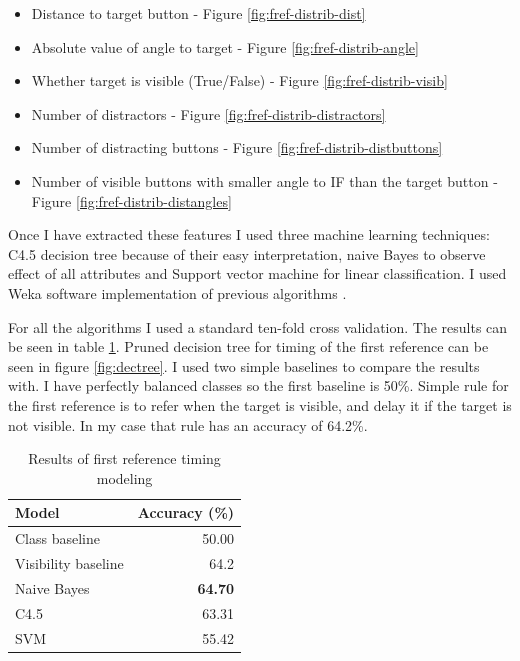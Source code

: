 \begin{itemize}
\item
Distance to target button - Figure \ref{fig:fref-distrib-dist}
\item
Absolute value of angle to target - Figure \ref{fig:fref-distrib-angle}
\item
Whether target is visible (True/False) - Figure \ref{fig:fref-distrib-visib}
\item
Number of distractors - Figure \ref{fig:fref-distrib-distractors}
\item
Number of distracting buttons - Figure \ref{fig:fref-distrib-distbuttons}
\item
Number of visible buttons with smaller angle to IF than the target button - Figure \ref{fig:fref-distrib-distangles}
\end{itemize}

Once I have extracted these features I used three machine learning techniques: C4.5 decision tree because of their easy interpretation, naive Bayes to observe effect of all attributes and Support vector machine for linear classification. I used Weka software implementation of previous algorithms \citep{hall2009weka}.

For all the algorithms I used a standard ten-fold cross validation. The results can be seen in table \ref{tab:firstref}. Pruned decision tree for timing of the first reference can be seen in figure \ref{fig:dectree}. I used two simple baselines to compare the results with. I have perfectly balanced classes so the first baseline is 50\%. Simple rule for the first reference is to refer when the target is visible, and delay it if the target is not visible. In my case that rule has an accuracy of 64.2\%. 

\begin{table}[!htbp]
 \centering
\begin{tabular}{lr}
\toprule
Model    & Accuracy (\%)  \\
\midrule
Class baseline    & 50.00\\
Visibility baseline & 64.2\\
\midrule
Naive Bayes  & \textbf{64.70} \\
C4.5 & 63.31 \\
SVM & 55.42 \\
\bottomrule
\end{tabular}
\caption{Results of first reference timing modeling}
\label{tab:firstref}
\end{table}

